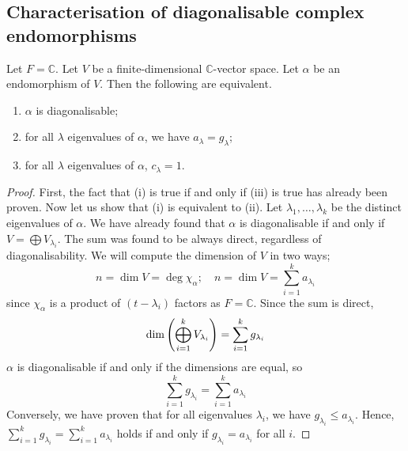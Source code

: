 \subsection{Characterisation of diagonalisable complex endomorphisms}
\begin{lemma}
	Let \( F = \mathbb C \).
	Let \( V \) be a finite-dimensional \( \mathbb C \)-vector space.
	Let \( \alpha \) be an endomorphism of \( V \).
	Then the following are equivalent.
	\begin{enumerate}
		\item \( \alpha \) is diagonalisable;
		\item for all \( \lambda \) eigenvalues of \( \alpha \), we have \( a_\lambda = g_\lambda \);
		\item for all \( \lambda \) eigenvalues of \( \alpha \), \( c_\lambda = 1 \).
	\end{enumerate}
\end{lemma}
\begin{proof}
	First, the fact that (i) is true if and only if (iii) is true has already been proven.
	Now let us show that (i) is equivalent to (ii).
	Let \( \lambda_1, \dots, \lambda_k \) be the distinct eigenvalues of \( \alpha \).
	We have already found that \( \alpha \) is diagonalisable if and only if \( V = \bigoplus V_{\lambda_i} \).
	The sum was found to be always direct, regardless of diagonalisability.
	We will compute the dimension of \( V \) in two ways;
	\[
		n = \dim V = \deg \chi_\alpha;\quad n = \dim V = \sum_{i=1}^k a_{\lambda_i}
	\]
	since \( \chi_\alpha \) is a product of \( (t-\lambda_i) \) factors as \( F = \mathbb C \).
	Since the sum is direct,
	\[
		\dim \qty(\bigoplus_{i=1}^k V_{\lambda_i}) = \sum_{i=1}^k g_{\lambda_i}
	\]
	\( \alpha \) is diagonalisable if and only if the dimensions are equal, so
	\[
		\sum_{i=1}^k g_{\lambda_i} = \sum_{i=1}^k a_{\lambda_i}
	\]
	Conversely, we have proven that for all eigenvalues \( \lambda_i \), we have \( g_{\lambda_i} \leq a_{\lambda_i} \).
	Hence, \( \sum_{i=1}^k g_{\lambda_i} = \sum_{i=1}^k a_{\lambda_i} \) holds if and only if \( g_{\lambda_i} = a_{\lambda_i} \) for all \( i \).
\end{proof}

